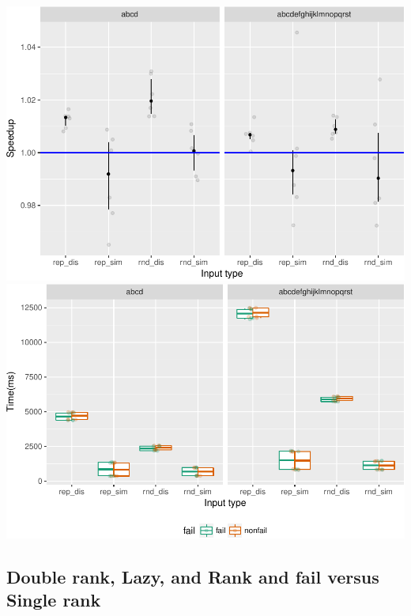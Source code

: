 \documentclass[]{article}
\begin{document}
\includegraphics{sea_2018_files/figure-latex/fail_plot-1.pdf}
\includegraphics{sea_2018_files/figure-latex/fail_plot-2.pdf}

\subsection{Double rank, Lazy, and Rank and fail versus Single
rank}\label{double-rank-lazy-and-rank-and-fail-versus-single-rank}
\end{document}
